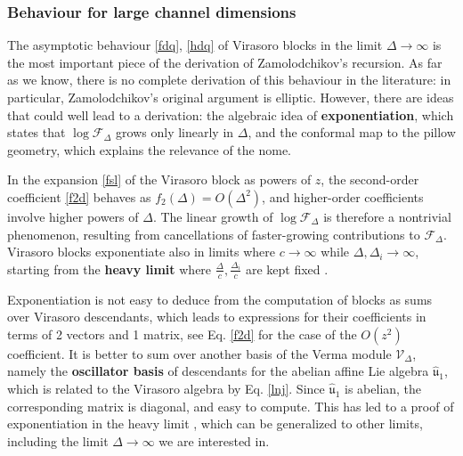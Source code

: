 \documentclass[12pt, a4paper]{article}
\newcommand{\myindex}[1]{\textbf{\boldmath #1}}
\begin{document}
\subsubsection{Behaviour for large channel dimensions} \label{sec:bld}

The asymptotic behaviour \eqref{fdq}, \eqref{hdq} of Virasoro blocks in the limit $\Delta\to\infty$ is the most important piece of the derivation of Zamolodchikov's recursion. As far as we know, there is no complete derivation of this behaviour in the literature: in particular, Zamolodchikov's original argument \cite{zam87b} is elliptic. However, there are ideas that could well lead to a derivation: the algebraic idea of \myindex{exponentiation}, which states that $\log\mathcal{F}_\Delta$ grows only linearly in $\Delta$, and the conformal map to the pillow geometry, which explains the relevance of the nome. 

In the expansion \eqref{fsl} of the Virasoro block as powers of $z$, the second-order coefficient \eqref{f2d} behaves as $f_2(\Delta)= O(\Delta^2)$, and higher-order coefficients involve higher powers of $\Delta$. 
The linear growth of $\log\mathcal{F}_\Delta$ is therefore a nontrivial phenomenon, resulting from cancellations of faster-growing contributions to $\mathcal{F}_\Delta$. Virasoro blocks exponentiate also in limits where $c\to\infty$ while $\Delta,\Delta_i\to \infty$, starting from the \myindex{heavy limit} where $\frac{\Delta}{c},\frac{\Delta_i}{c}$ are kept fixed \cite{al24}.

Exponentiation is not easy to deduce from the computation of blocks as sums over Virasoro descendants, which leads to expressions for their coefficients in terms of 2 vectors and 1 matrix, see Eq. \eqref{f2d} for the case of the $O(z^2)$ coefficient. It is better to sum over another basis of the Verma module $\mathcal{V}_\Delta$, namely the \myindex{oscillator basis} of descendants for the abelian affine Lie algebra $\hat{\mathfrak{u}}_1$, which is related to the Virasoro algebra by Eq. \eqref{lnj}. Since $\hat{\mathfrak{u}}_1$ is abelian, the corresponding matrix is diagonal, and easy to compute. This has led to a proof of exponentiation in the heavy limit \cite{bdk19}, which can be generalized to other limits, including the limit $\Delta\to \infty$ we are interested in. 
\end{document}
